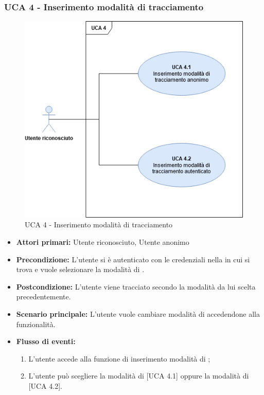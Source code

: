 \subsubsection{UCA 4 - Inserimento modalità di tracciamento}%

\begin{figure}[h!]
	\centering	
	\includegraphics[scale=0.53, center]{Sezioni/UseCase/Immagini/UCA4.png}
	\caption{UCA 4 - Inserimento modalità di tracciamento}
\end{figure}

\begin{itemize}
	\item \textbf{Attori primari:} Utente riconosciuto, Utente anonimo
	\item \textbf{Precondizione:} L'utente si è autenticato con le credenziali  nella  in cui si trova e vuole selezionare la modalità di .
	\item \textbf{Postcondizione:} L'utente viene tracciato secondo la modalità da lui scelta precedentemente.
	\item \textbf{Scenario principale:} L'utente vuole cambiare modalità di  accedendone alla funzionalità.
	\item \textbf{Flusso di eventi:}
	\begin{enumerate}
		\item L'utente accede alla funzione di inserimento modalità di ;
		\item L'utente può scegliere la modalità di  [UCA 4.1] oppure la modalità di  [UCA 4.2].
	\end{enumerate}
\end{itemize}

